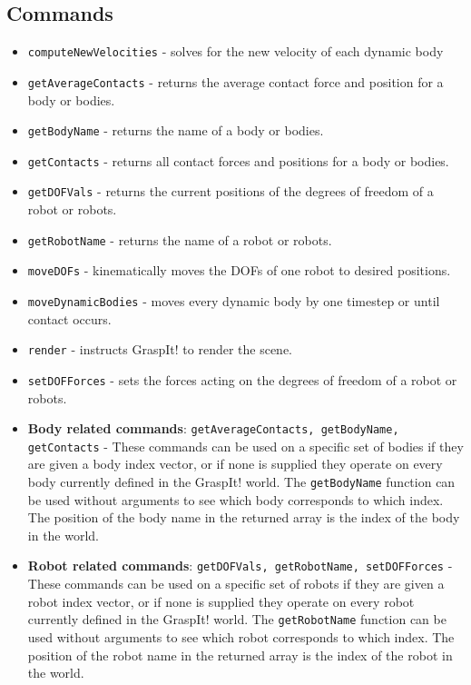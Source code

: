 \subsection{Commands}
\begin{itemize}
\item \texttt{computeNewVelocities} - solves for the new velocity of
  each dynamic body
\item \texttt{getAverageContacts} - returns the average contact force
  and position for a body or bodies.
\item \texttt{getBodyName} - returns the name of a body or bodies.
\item \texttt{getContacts} - returns all contact forces and positions
  for a body or bodies.
\item \texttt{getDOFVals} - returns the current positions of the
  degrees of freedom of a robot or robots.
\item \texttt{getRobotName} - returns the name of a robot or robots.
\item \texttt{moveDOFs} - kinematically moves the DOFs of one robot to
  desired positions.
\item \texttt{moveDynamicBodies} - moves every dynamic body by one
  timestep or until contact occurs.
\item \texttt{render} - instructs GraspIt! to render the scene.
\item \texttt{setDOFForces} - sets the forces acting on the degrees of
  freedom of a robot or robots.
\item \textbf{Body related commands}: \texttt{getAverageContacts,
  getBodyName, getContacts} - These commands can be used on a specific
  set of bodies if they are given a body index vector, or if none is
  supplied they operate on every body currently defined in the
  GraspIt! world. The \texttt{getBodyName} function can be used
  without arguments to see which body corresponds to which index. The
  position of the body name in the returned array is the index of the
  body in the world.
\item \textbf{Robot related commands}: \texttt{getDOFVals,
  getRobotName, setDOFForces} - These commands can be used on a
  specific set of robots if they are given a robot index vector, or if
  none is supplied they operate on every robot currently defined in
  the GraspIt! world. The \texttt{getRobotName} function can be used
  without arguments to see which robot corresponds to which index. The
  position of the robot name in the returned array is the index of the
  robot in the world.


\end{itemize}
